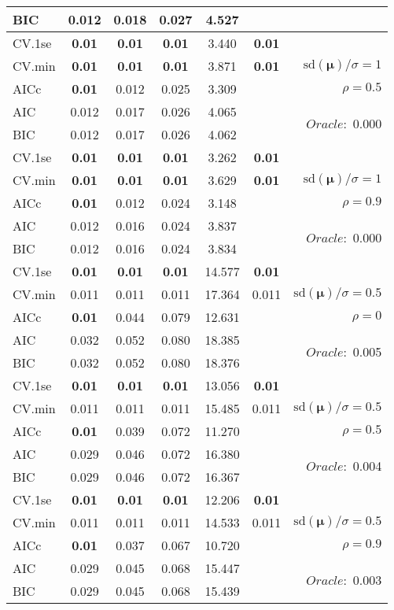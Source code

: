 \begin{table}
\begin{center}
\begin{tabular}{l*{5}{c}|r}
BIC & 0.012 & 0.018 & 0.027 & 4.527 & &  \\
 \hline 
CV.1se & {\bf 0.01} & {\bf 0.01} & {\bf 0.01} & 3.440 & {\bf 0.01} & \\
CV.min & {\bf 0.01} & {\bf 0.01} & {\bf 0.01} & 3.871 & {\bf 0.01} &  $\mathrm{sd}(\mathbf{\mu})/\sigma=1$ \\
AICc & {\bf 0.01} & 0.012 & 0.025 & 3.309 & & $\rho=0.5$ \\
AIC & 0.012 & 0.017 & 0.026 & 4.065 & &  \multirow{2}{*}{$Oracle: $ 0.000} \\
BIC & 0.012 & 0.017 & 0.026 & 4.062 & &  \\
 \hline 
CV.1se & {\bf 0.01} & {\bf 0.01} & {\bf 0.01} & 3.262 & {\bf 0.01} & \\
CV.min & {\bf 0.01} & {\bf 0.01} & {\bf 0.01} & 3.629 & {\bf 0.01} &  $\mathrm{sd}(\mathbf{\mu})/\sigma=1$ \\
AICc & {\bf 0.01} & 0.012 & 0.024 & 3.148 & & $\rho=0.9$ \\
AIC & 0.012 & 0.016 & 0.024 & 3.837 & &  \multirow{2}{*}{$Oracle: $ 0.000} \\
BIC & 0.012 & 0.016 & 0.024 & 3.834 & &  \\
 \hline 
CV.1se & {\bf 0.01} & {\bf 0.01} & {\bf 0.01} & 14.577 & {\bf 0.01} & \\
CV.min & 0.011 & 0.011 & 0.011 & 17.364 & 0.011 &  $\mathrm{sd}(\mathbf{\mu})/\sigma=0.5$ \\
AICc & {\bf 0.01} & 0.044 & 0.079 & 12.631 & & $\rho=0$ \\
AIC & 0.032 & 0.052 & 0.080 & 18.385 & &  \multirow{2}{*}{$Oracle: $ 0.005} \\
BIC & 0.032 & 0.052 & 0.080 & 18.376 & &  \\
 \hline 
CV.1se & {\bf 0.01} & {\bf 0.01} & {\bf 0.01} & 13.056 & {\bf 0.01} & \\
CV.min & 0.011 & 0.011 & 0.011 & 15.485 & 0.011 &  $\mathrm{sd}(\mathbf{\mu})/\sigma=0.5$ \\
AICc & {\bf 0.01} & 0.039 & 0.072 & 11.270 & & $\rho=0.5$ \\
AIC & 0.029 & 0.046 & 0.072 & 16.380 & &  \multirow{2}{*}{$Oracle: $ 0.004} \\
BIC & 0.029 & 0.046 & 0.072 & 16.367 & &  \\
 \hline 
CV.1se & {\bf 0.01} & {\bf 0.01} & {\bf 0.01} & 12.206 & {\bf 0.01} & \\
CV.min & 0.011 & 0.011 & 0.011 & 14.533 & 0.011 &  $\mathrm{sd}(\mathbf{\mu})/\sigma=0.5$ \\
AICc & {\bf 0.01} & 0.037 & 0.067 & 10.720 & & $\rho=0.9$ \\
AIC & 0.029 & 0.045 & 0.068 & 15.447 & &  \multirow{2}{*}{$Oracle: $ 0.003} \\
BIC & 0.029 & 0.045 & 0.068 & 15.439 & &  \\
 \hline 
\end{tabular}
\end{center}
\vspace{-1cm}
\end{table}




